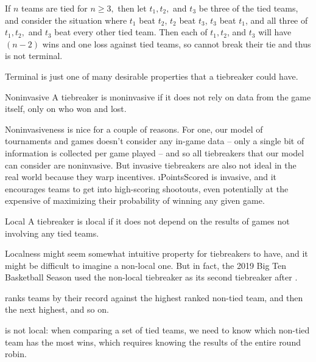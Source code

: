 {{        If $n$ teams are tied for $n \geq 3,$ then let $t_1, t_2,$ and $t_3$ be three of the tied teams, and consider the situation where $t_1$ beat $t_2$, $t_2$ beat $t_3$, $t_3$ beat $t_1$, and all three of $t_1, t_2,$ and $t_3$ beat every other tied team. Then each of $t_1, t_2$, and $t_3$ will have $(n-2)$ wins and one loss against tied teams, so  cannot break their tie and thus is not terminal.
    }{}

    Terminal is just one of many desirable properties that a tiebreaker could have.

    \begin{definition}{Noninvasive}{}
        A tiebreaker is \i{noninvasive} if it does not rely on data from the game itself, only on who won and lost.
    \end{definition}

    Noninvasiveness is nice for a couple of reasons. For one, our model of tournaments and games doesn't consider any in-game data -- only a single bit of information is collected per game played -- and so all tiebreakers that our model can consider are noninvasive. But invasive tiebreakers are also not ideal in the real world because they warp incentives. \i{PointsScored} is invasive, and it encourages teams to get into high-scoring shootouts, even potentially at the expensive of maximizing their probability of winning any given game.

    \begin{definition}{Local}{}
        A tiebreaker is \i{local} if it does not depend on the results of games not involving any tied teams.
    \end{definition}

    Localness might seem somewhat intuitive property for tiebreakers to have, and it might be difficult to imagine a non-local one. But in fact, the 2019 Big Ten Basketball Season used the non-local tiebreaker  as its second tiebreaker after .

    \begin{definition}{}{}
         ranks teams by their record against the highest ranked non-tied team, and then the next highest, and so on.
    \end{definition}

     is not local: when comparing a set of tied teams, we need to know which non-tied team has the most wins, which requires knowing the results of the entire round robin.

}

